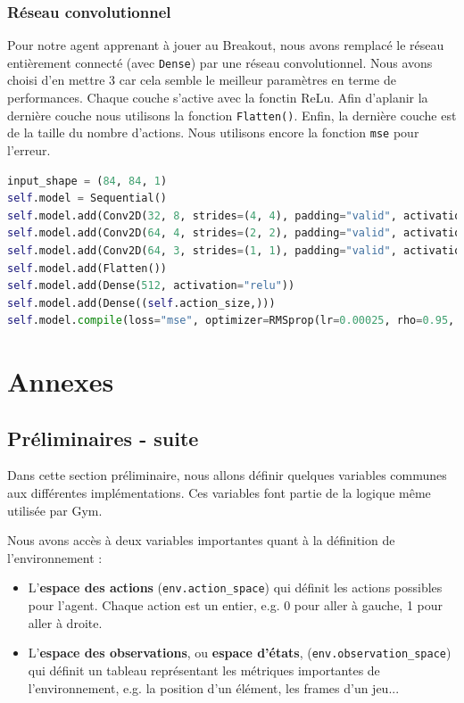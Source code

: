 \documentclass[10pt,a4paper]{article}
\begin{document}
\subsubsection{Réseau convolutionnel}

Pour notre agent apprenant à jouer au Breakout, nous avons remplacé le réseau entièrement connecté (avec \lstinline{Dense}) par une réseau convolutionnel. Nous avons choisi d'en mettre 3 car cela semble le meilleur paramètres en terme de performances. Chaque couche s'active avec la fonctin ReLu. Afin d'aplanir la dernière couche nous utilisons la fonction \lstinline{Flatten()}. Enfin, la dernière couche est de la taille du nombre d'actions. Nous utilisons encore la fonction \lstinline{mse} pour l'erreur.

\begin{lstlisting}[language=Python]
input_shape = (84, 84, 1)
self.model = Sequential()
self.model.add(Conv2D(32, 8, strides=(4, 4), padding="valid", activation="relu", input_shape=input_shape, data_format="channels_first"))
self.model.add(Conv2D(64, 4, strides=(2, 2), padding="valid", activation="relu", input_shape=input_shape, data_format="channels_first"))
self.model.add(Conv2D(64, 3, strides=(1, 1), padding="valid", activation="relu", input_shape=input_shape, data_format="channels_first"))
self.model.add(Flatten())
self.model.add(Dense(512, activation="relu"))
self.model.add(Dense((self.action_size,)))
self.model.compile(loss="mse", optimizer=RMSprop(lr=0.00025, rho=0.95, epsilon=0.01), metrics=["accuracy"])
\end{lstlisting}

\section{Annexes} \label{annexes}

\subsection{Préliminaires - suite}


Dans cette section préliminaire, nous allons définir quelques variables communes aux différentes implémentations. Ces variables font partie de la logique même utilisée par Gym.

Nous avons accès à deux variables importantes quant à la définition de l'environnement :
\begin{itemize}
	\item L'\textbf{espace des actions} (\lstinline{env.action_space}) qui définit les actions possibles pour l'agent. Chaque action est un entier, e.g. 0 pour aller à gauche, 1 pour aller à droite.
	\item L'\textbf{espace des observations}, ou \textbf{espace d'états}, (\lstinline{env.observation_space}) qui définit un tableau représentant les métriques importantes de l'environnement, e.g. la position d'un élément, les frames d'un jeu...
\end{itemize}
\end{document}
